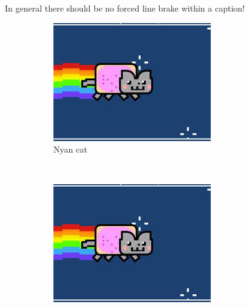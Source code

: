 \documentclass[12pt, %
               a4paper, %
               twoside, %
               openright, %
               abstract=on, %
               DIV=11,      %
               BCOR=8mm]{scrbook} %
\begin{document}
In general there should be no forced line brake within a caption!

\begin{figure}
          \centering
        \begin{subfigure}[b]{0.3\textwidth}
                \includegraphics[width=\textwidth]{img/cat.jpeg}
                \caption{Nyan cat}
                \label{fig:cat1}
        \end{subfigure}%
        ~ %
        \begin{subfigure}[b]{0.3\textwidth}
                \includegraphics[width=\textwidth]{img/cat.jpeg}

\end{subfigure}
\end{figure}
\end{document}
